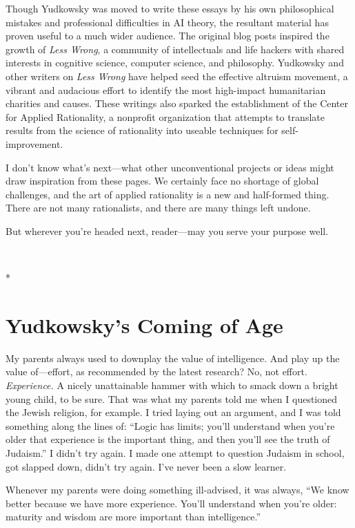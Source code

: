 {
 Though Yudkowsky was moved to write these essays by his own
philosophical mistakes and professional difficulties in AI theory, the
resultant material has proven useful to a much wider audience. The
original blog posts inspired the growth of \textit{Less Wrong}, a
community of intellectuals and life hackers with shared interests in
cognitive science, computer science, and philosophy. Yudkowsky and
other writers on \textit{Less Wrong} have helped seed the effective
altruism movement, a vibrant and audacious effort to identify the most
high-impact humanitarian charities and causes. These writings also
sparked the establishment of the Center for Applied Rationality, a
nonprofit organization that attempts to translate results from the
science of rationality into useable techniques for self-improvement.}

{
 I don't know what's next---what
other unconventional projects or ideas might draw inspiration from
these pages. We certainly face no shortage of global challenges, and
the art of applied rationality is a new and half-formed thing. There
are not many rationalists, and there are many things left undone.}

{
 But wherever you're headed next, reader---may you
serve your purpose well.}

{
 ~}

{\centering
 *
\par}


\bigskip

\chapter{Yudkowsky's Coming of Age}


{
 My parents always used to downplay the value of intelligence. And
play up the value of---effort, as recommended by the latest research?
No, not effort. \textit{Experience.} A nicely unattainable hammer with
which to smack down a bright young child, to be sure. That was what my
parents told me when I questioned the Jewish religion, for example. I
tried laying out an argument, and I was told something along the lines
of: ``Logic has limits; you'll
understand when you're older that experience is the
important thing, and then you'll see the truth of
Judaism.'' I didn't try again. I made
one attempt to question Judaism in school, got slapped down,
didn't try again. I've never been a
slow learner. }

{
 Whenever my parents were doing something ill-advised, it was
always, ``We know better because we have more
experience. You'll understand when
you're older: maturity and wisdom are more important
than intelligence.''}

